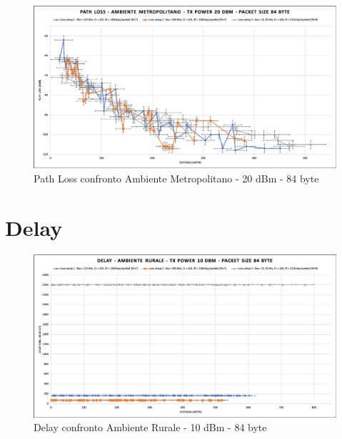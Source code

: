 \documentclass[12pt,a4paper,openright,twoside]{report}
\begin{document}
\begin{figure}[h]                      
\begin{center} 
\includegraphics[width=\textwidth]{PATH_LOSS_confronto_AM_20dBm_84byte.png}
\caption[Path Loss confronto Ambiente Metropolitano - 20 dBm - 84 byte]{Path Loss confronto Ambiente Metropolitano - 20 dBm - 84 byte}\label{fig:prima}
\end{center}
\end{figure}

\section{Delay}
\begin{figure}[h]                      
\begin{center} 
\includegraphics[width=\textwidth]{DELAY_confronto_AR_10dBm_84byte.png}
\caption[Delay confronto Ambiente Rurale - 10 dBm - 84 byte]{Delay confronto Ambiente Rurale - 10 dBm - 84 byte}\label{fig:prima}
\end{center}
\end{figure}
\end{document}
